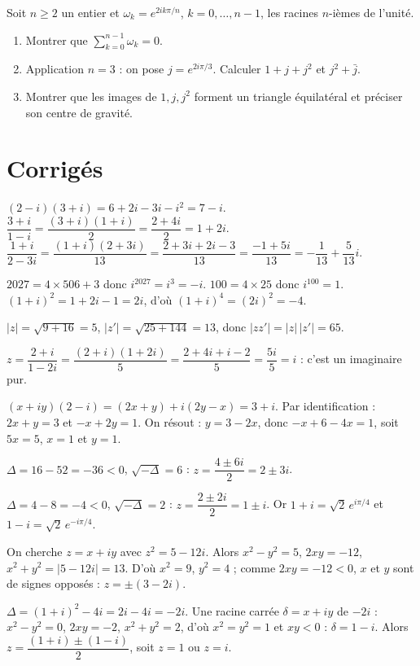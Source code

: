 Soit $n\ge2$ un entier et $\omega_k=e^{2ik\pi/n}$, $k=0,\dots,n-1$, les racines $n$-ièmes de
l'unité.
\begin{enumerate}[label=\arabic*)]
\item Montrer que $\displaystyle\sum_{k=0}^{n-1}\omega_k=0$.
\item Application $n=3$ : on pose $j=e^{2i\pi/3}$. Calculer $1+j+j^{2}$ et $j^{2}+\bar j$.
\item Montrer que les images de $1,j,j^{2}$ forment un triangle équilatéral et préciser son centre
de gravité.
\end{enumerate}

\section{Corrigés}

$(2-i)(3+i)=6+2i-3i-i^{2}=7-i$.\;
$\dfrac{3+i}{1-i}=\dfrac{(3+i)(1+i)}{2}=\dfrac{2+4i}{2}=1+2i$.\;
$\dfrac{1+i}{2-3i}=\dfrac{(1+i)(2+3i)}{13}=\dfrac{2+3i+2i-3}{13}=\dfrac{-1+5i}{13}
=-\dfrac1{13}+\dfrac{5}{13}i$.

$2027=4\times506+3$ donc $i^{2027}=i^{3}=-i$.\; $100=4\times25$ donc $i^{100}=1$.\;
$(1+i)^{2}=1+2i-1=2i$, d'où $(1+i)^{4}=(2i)^{2}=-4$.

$|z|=\sqrt{9+16}=5$,\; $|z'|=\sqrt{25+144}=13$,\; donc $|zz'|=|z|\,|z'|=65$.

$z=\dfrac{2+i}{1-2i}=\dfrac{(2+i)(1+2i)}{5}=\dfrac{2+4i+i-2}{5}=\dfrac{5i}{5}=i$ : c'est un
imaginaire pur.

$(x+iy)(2-i)=(2x+y)+i(2y-x)=3+i$. Par identification : $2x+y=3$ et $-x+2y=1$. On résout :
$y=3-2x$, donc $-x+6-4x=1$, soit $5x=5$, $x=1$ et $y=1$.

$\Delta=16-52=-36<0$, $\sqrt{-\Delta}=6$ : $z=\dfrac{4\pm6i}{2}=2\pm3i$.

$\Delta=4-8=-4<0$, $\sqrt{-\Delta}=2$ : $z=\dfrac{2\pm2i}{2}=1\pm i$. Or $1+i=\sqrt2\,e^{i\pi/4}$ et
$1-i=\sqrt2\,e^{-i\pi/4}$.

On cherche $z=x+iy$ avec $z^{2}=5-12i$. Alors $x^{2}-y^{2}=5$, $2xy=-12$, $x^{2}+y^{2}=|5-12i|=13$.
D'où $x^{2}=9$, $y^{2}=4$ ; comme $2xy=-12<0$, $x$ et $y$ sont de signes opposés :
$z=\pm(3-2i)$.

$\Delta=(1+i)^{2}-4i=2i-4i=-2i$. Une racine carrée $\delta=x+iy$ de $-2i$ : $x^{2}-y^{2}=0$,
$2xy=-2$, $x^{2}+y^{2}=2$, d'où $x^{2}=y^{2}=1$ et $xy<0$ : $\delta=1-i$. Alors
$z=\dfrac{(1+i)\pm(1-i)}{2}$, soit $z=1$ ou $z=i$.

